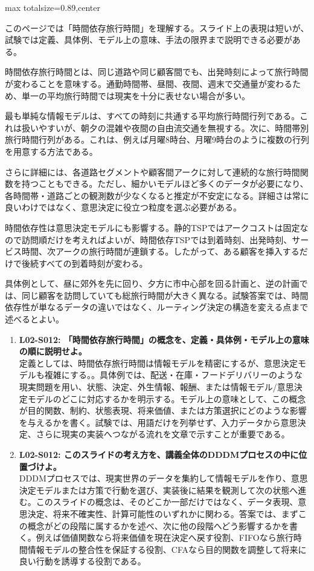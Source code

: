 \begin{minipage}[t]{0.58\textwidth}
\begin{adjustbox}{max totalsize={\textwidth}{0.89\textheight},center}
\begin{minipage}{\textwidth}\scriptsize
{}このページでは「時間依存旅行時間」を理解する。スライド上の表現は短いが、試験では定義、具体例、モデル上の意味、手法の限界まで説明できる必要がある。\par
時間依存旅行時間とは、同じ道路や同じ顧客間でも、出発時刻によって旅行時間が変わることを意味する。通勤時間帯、昼間、夜間、週末で交通量が変わるため、単一の平均旅行時間では現実を十分に表せない場合が多い。\par
最も単純な情報モデルは、すべての時刻に共通する平均旅行時間行列である。これは扱いやすいが、朝夕の混雑や夜間の自由流交通を無視する。次に、時間帯別旅行時間行列がある。これは、例えば月曜8時台、月曜9時台のように複数の行列を用意する方法である。\par
さらに詳細には、各道路セグメントや顧客間アークに対して連続的な旅行時間関数を持つこともできる。ただし、細かいモデルほど多くのデータが必要になり、各時間帯・道路ごとの観測数が少なくなると推定が不安定になる。詳細さは常に良いわけではなく、意思決定に役立つ粒度を選ぶ必要がある。\par
時間依存性は意思決定モデルにも影響する。静的TSPではアークコストは固定なので訪問順だけを考えればよいが、時間依存TSPでは到着時刻、出発時刻、サービス時間、次アークの旅行時間が連鎖する。したがって、ある顧客を挿入するだけで後続すべての到着時刻が変わる。\par
具体例として、昼に郊外を先に回り、夕方に市中心部を回る計画と、逆の計画では、同じ顧客を訪問していても総旅行時間が大きく異なる。試験答案では、時間依存性が単なるデータの違いではなく、ルーティング決定の構造を変える点まで述べるとよい。\par{}\begin{enumerate}\item \textbf{L02-S012: 「時間依存旅行時間」の概念を、定義・具体例・モデル上の意味の順に説明せよ。}\\定義としては、時間依存旅行時間は情報モデルを精密にするが、意思決定モデルも複雑にする。。具体例では、配送・在庫・フードデリバリーのような現実問題を用い、状態、決定、外生情報、報酬、または情報モデル/意思決定モデルのどこに対応するかを明示する。モデル上の意味として、この概念が目的関数、制約、状態表現、将来価値、または方策選択にどのような影響を与えるかを書く。試験では、用語だけを列挙せず、入力データから意思決定、さらに現実の実装へつながる流れを文章で示すことが重要である。\item \textbf{L02-S012: このスライドの考え方を、講義全体のDDDMプロセスの中に位置づけよ。}\\DDDMプロセスでは、現実世界のデータを集約して情報モデルを作り、意思決定モデルまたは方策で行動を選び、実装後に結果を観測して次の状態へ進む。このスライドの概念は、そのどこか一部だけではなく、データ表現、意思決定、将来不確実性、計算可能性のいずれかに関わる。答案では、まずこの概念がどの段階に属するかを述べ、次に他の段階へどう影響するかを書く。例えば価値関数なら将来価値を現在決定へ戻す役割、FIFOなら旅行時間情報モデルの整合性を保証する役割、CFAなら目的関数を調整して将来に良い行動を誘導する役割である。\end{enumerate}

\end{minipage}
\end{adjustbox}
\end{minipage}
